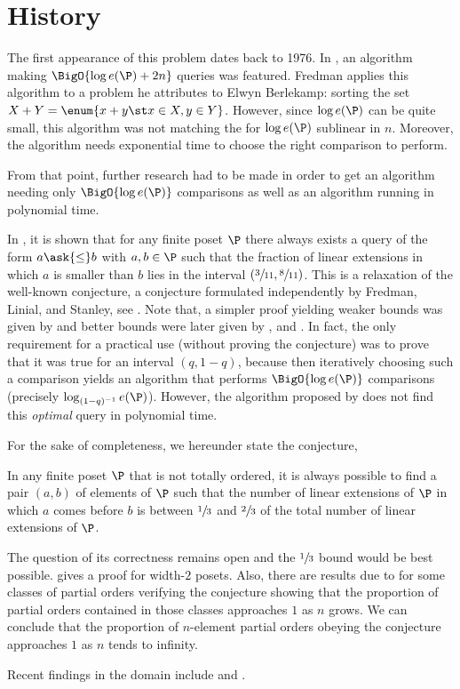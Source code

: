 \section{History}

The first appearance of this problem dates back to 1976. In
\citet*{fredman:1976}, an algorithm making $\BigO{\log e(\P) + 2n}$ queries was
featured. Fredman applies this algorithm to a problem he attributes to Elwyn
Berlekamp: sorting the set $X + Y = \enum{x + y \st x \in X, y \in Y}$.
However,
since \(\log e(\P)\) can be quite small, this algorithm was not matching the \ITLB
for $\log e(\P)$ sublinear in \(n\). Moreover, the algorithm needs exponential time to
choose the right comparison to perform.

From that point, further research had to be made in order to get an algorithm
needing only $\BigO{\log e(\P)}$ comparisons as well as an algorithm running in
polynomial time.

In \citet*{kahn1984balancing}, it is shown that for any finite poset \(\P\)
there always exists a query of the form \(a \ask{\leq} b\) with \(a,b \in \P\)
such that the fraction of linear extensions in which $a$ is smaller than $b$
lies in the interval $(\sfrac{3}{11}, \sfrac{8}{11})$. This is a relaxation of
the well-known \onethirdtwothird conjecture, a conjecture formulated
independently by Fredman, Linial, and Stanley, see
\citet*{linial:1984}. Note that, a simpler proof yielding weaker
bounds was given by \citet*{kahn1991balancing} and better bounds were later
given by \citet*{brightwell1995balancing}, and \citet*{brightwell1999balanced}.
In fact, the only requirement for a practical use (without proving the
conjecture) was to prove that it was true for an interval $(q, 1-q)$, because
then iteratively choosing such a comparison yields an algorithm that performs
$\BigO{\log e(\P)}$ comparisons (precisely $\log_{(1-q)^{-1}} e(\P)$). However, the
algorithm proposed by \citet*{kahn1984balancing} does not find this
\emph{optimal} query in polynomial time.

For the sake of completeness, we hereunder state the \onethirdtwothird
conjecture,
\begin{conjecture}
In any finite poset $\P$ that is not totally ordered, it is always possible to
find a pair $(a,b)$ of elements of $\P$ such that the number of linear
extensions of $\P$ in which $a$ comes before $b$ is between $\sfrac{1}{3}$ and
$\sfrac{2}{3}$ of the total number of linear extensions of $\P$.
\end{conjecture}

The question of its correctness remains open and the
$\sfrac{1}{3}$ bound would be best possible. \citet*{linial:1984} gives a proof
for width-\(2\) posets. Also, there are results due to
\citet*{peczarski:2006} for some classes of partial orders verifying the
conjecture showing that the proportion of partial orders contained in those
classes approaches $1$ as $n$ grows. We can conclude that the proportion of
$n$-element partial orders obeying the \onethirdtwothird conjecture approaches
$1$ as \(n\) tends to infinity.

Recent findings in the domain include \citet*{zaguia:2011} and
\citet*{peczarski:2008}.
